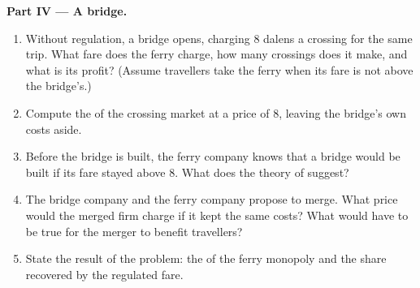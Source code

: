 \begin{problem}
\medskip
\noindent\textbf{Part IV --- A bridge.}
\begin{enumerate}[resume]
\item Without regulation, a bridge opens, charging 8 dalens a crossing for the same trip. What fare does the ferry charge, how many crossings does it make, and what is its
profit? (Assume travellers take the ferry when its fare is not above the bridge's.)
\item Compute the  of the crossing market at a price of 8, leaving the bridge's own costs aside.
\item Before the bridge is built, the ferry company knows that a bridge would be built if its fare stayed above 8. What does the theory of  suggest?
\item The bridge company and the ferry company propose to merge. What price would the merged firm charge if it kept the same costs? What would have to be true for the
merger to benefit travellers?
\item State the result of the problem: the  of the ferry monopoly and the share recovered by the regulated fare.
\end{enumerate}
\end{problem}
